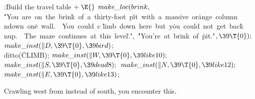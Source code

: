 \B{}:Build the travel table\X${}\mathrel+\E{}$\6
$\\{make\_loc}(\\{brink},{}$\6
\.{"You\ are\ on\ the\ brin}\)\.{k\ of\ a\ thirty-foot\ p}\)\.{it\ with\ a\
massive\ or}\)\.{ange\ column\\ndown\ on}\)\.{e\ wall.\ \ You\ could\ c}\)%
\.{limb\ down\ here\ but\ y}\)\.{ou\ could\ not\ get\ bac}\)\.{k\\nup.\ \ The\
maze\ con}\)\.{tinues\ at\ this\ level}\)\.{."}${},{}$\6
\.{"You're\ at\ brink\ of\ }\)\.{pit."}${},\39\T{0});{}$\6
${}\\{make\_inst}(\|D,\39\T{0},\39\\{bird}){}$;\5
\\{ditto}(\.{CLIMB});\6
${}\\{make\_inst}(\|W,\39\T{0},\39\\{like10});{}$\6
${}\\{make\_inst}(\|S,\39\T{0},\39\\{dead8});{}$\6
${}\\{make\_inst}(\|N,\39\T{0},\39\\{like12});{}$\6
${}\\{make\_inst}(\|E,\39\T{0},\39\\{like13}){}$;\par
\fi

Crawling west from  instead of south, you
encounter this.

